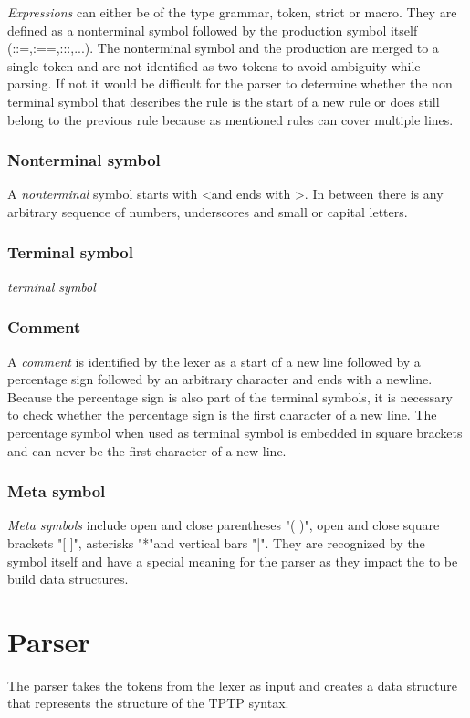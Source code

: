 \textit{Expressions} can either be of the type grammar, token, strict or macro. 
They are defined as a nonterminal symbol followed by the production symbol itself (::=,:==,:::,...). 
The nonterminal symbol and the production are merged to a single token and are not identified as two
tokens to avoid ambiguity while parsing.
If not it would be difficult for the parser to determine whether the non terminal symbol that describes the rule is the start of a new rule or does still belong to the previous rule because as mentioned rules can cover multiple lines.

\subsubsection{Nonterminal symbol}
A \textit{nonterminal} symbol starts with \textless  and ends with \textgreater . In between there is any
arbitrary sequence of numbers, underscores and small or capital letters.

\subsubsection{Terminal symbol}
\textit{terminal symbol}

\subsubsection{Comment}
A \textit{comment} is identified by the lexer as a start of a new line followed by a percentage sign followed by an arbitrary character and ends with a newline. Because the percentage sign is also part of the terminal symbols, it is necessary to check whether the percentage sign is the first character of a new line. The percentage symbol when used as terminal symbol is embedded in square brackets and can never be the first character of a new line.

\subsubsection{Meta symbol}
\textit{Meta symbols} include open and close parentheses "( )", open and close square
brackets "[ ]", asterisks "*"and vertical bars "|".
They are recognized by the symbol itself and have a special meaning for the parser as they impact the to be build data structures.

\section{Parser}\label{sec:ConceptParser}
The parser takes the tokens from the lexer as input and creates a data structure that represents the structure of the \ac{TPTP} syntax.

